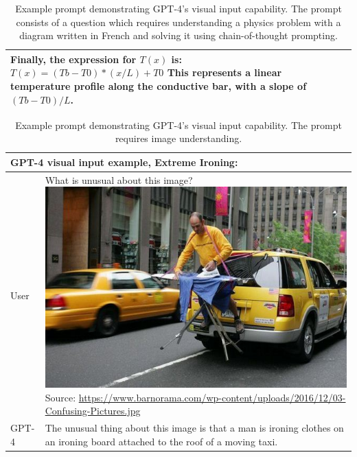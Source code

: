 \documentclass{article}
\begin{document}
\begin{table}
\begin{tabular}[]{p{0.5in}p{4.5in}}
\newline
Finally, the expression for $T(x)$ is:\newline
$T(x) = (Tb - T0) * (x / L) + T0$\newline
This represents a linear temperature profile along the conductive bar, with a slope of $(Tb - T0) / L$.\\
\bottomrule
\end{tabular}
\caption{Example prompt demonstrating GPT-4's visual input capability. The prompt consists of a question which requires understanding a physics problem with a diagram written in French and solving it using chain-of-thought prompting.}
\label{table:visual_input_ecole}
\end{table}

\begin{table}
\begin{tabular}[]{p{0.5in}p{4.5in}}
\toprule
\multicolumn{2}{p{5in}}{
\textbf{GPT-4 visual input example, Extreme Ironing}:}\\
\midrule
User & What is unusual about this image?\newline\newline
\includegraphics[width=0.8\linewidth]{assets/taxi.jpg}\newline
\scriptsize{Source: \url{https://www.barnorama.com/wp-content/uploads/2016/12/03-Confusing-Pictures.jpg}}\newline\newline
\\
GPT-4 & The unusual thing about this image is that a man is ironing clothes on an ironing board attached to the roof of a moving taxi.\\
\bottomrule
\end{tabular}
\caption{Example prompt demonstrating GPT-4's visual input capability. The prompt requires image understanding.}
\label{table:visual_input_taxi}
\end{table}
\end{document}
